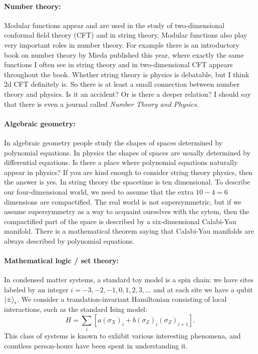 \documentclass[12pt]{article}
\numberwithin{equation}{section}
\begin{document}
\paragraph{Number theory:}
Modular functions appear and are used in the study of two-dimensional conformal field theory (CFT) and in string theory.
Modular functions also play very important roles in number theory.
For example there is an introductory book on number theory by Mieda \cite{Mieda} published this year,
where exactly the same functions I often see in string theory and in two-dimensional CFT appears throughout the book.
Whether string theory is physics is debatable, but I think 2d CFT definitely is.
So there is at least a small connection between number theory and physics.
Is it an accident? Or is there a deeper relation?
I should say that there is even a journal called \emph{Number Theory and Physics}.

\paragraph{Algebraic geometry:}
In algebraic geometry people study the shapes of spaces determined by polynomial equations. 
In physics the shapes of spaces are usually determined by differential equations.
Is there a place where polynomial equations naturally appear in physics?
If you are kind enough to consider string theory physics, then the answer is yes.
In string theory the spacetime is ten dimensional.
To describe our four-dimensional world, we need to assume that the extra $10-4=6$ dimensions are compactified.
The real world is not supersymmetric, but if we assume supersymmetry as a way to acquaint ourselves with the sytem,
then the compactified part of the space is described by a six-dimensional Calabi-Yau manifold.
There is a mathematical theorem saying that Calabi-Yau manifolds are always described by polynomial equations.

\paragraph{Mathematical logic / set theory:}
In condensed matter systems, a standard toy model is a spin chain:
we have sites labeled by an integer $i=-3, -2, -1, 0, 1, 2, 3, \ldots$
and at each site we have a qubit $\ket{\pm}_i$. 
We consider a translation-invariant Hamiltonian consisting of local interactions,
such as the  standard Ising model: \begin{equation}
H = \sum_i [ a (\sigma_X)_i + b (\sigma_Z)_i (\sigma_Z)_{i+1} ].
\end{equation}
This class of systems is known to exhibit various interesting phenomena,
and countless person-hours have been spent in understanding it. 
\end{document}
